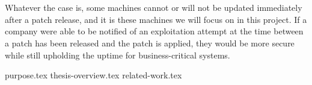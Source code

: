 \documentclass{report}
\begin{document}
\\
\\
Whatever the case is, some machines cannot or will not be updated immediately after a patch release, and it is these machines we will focus on in this project. If a company were able to be notified of an exploitation attempt at the time between a patch has been released and the patch is applied, they would be more secure while still upholding the uptime for business-critical systems.

{purpose.tex}
{thesis-overview.tex}
\newpage
{related-work.tex}

\end{document}
